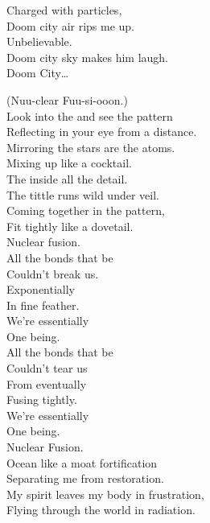Charged with particles, \\
Doom city air rips me up. \\
Unbelievable. \\
Doom city sky makes him laugh. \\

Doom City… \\





(Nuu-clear Fuu-si-ooon.) \\

Look into the  and see the pattern \\
Reflecting in your eye from a distance. \\
Mirroring the stars are the atoms. \\
Mixing up like a cocktail. \\

The  inside all the detail. \\
The tittle runs wild under veil. \\
Coming together in the pattern, \\
Fit tightly like a dovetail. \\

Nuclear fusion. \\

All the bonds that be \\
Couldn't break us. \\
Exponentially \\
In fine feather. \\
We're essentially \\
One being. \\

All the bonds that be \\
Couldn't tear us \\
From eventually \\
Fusing tightly. \\
We're essentially \\
One being. \\
Nuclear Fusion. \\

Ocean like a moat fortification \\
Separating me from restoration. \\
My spirit leaves my body in frustration, \\
Flying through the world in radiation. \\

